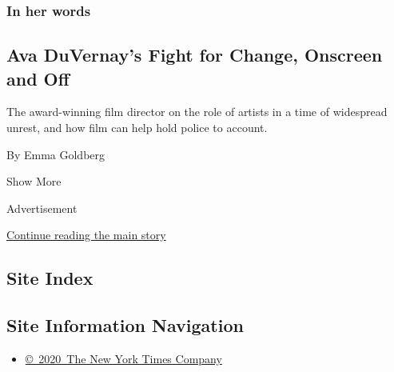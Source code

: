 \begin{enumerate}
  \hypertarget{in-her-words-4}{%
  \subsubsection{In her words}\label{in-her-words-4}}

  \hypertarget{ava-duvernays-fight-for-change-onscreen-and-off}{%
  \subsection{Ava DuVernay's Fight for Change, Onscreen and
  Off}\label{ava-duvernays-fight-for-change-onscreen-and-off}}

  The award-winning film director on the role of artists in a time of
  widespread unrest, and how film can help hold police to account.

  By Emma Goldberg
\end{enumerate}

Show More

Advertisement

\protect\hyperlink{after-mid2}{Continue reading the main story}

\hypertarget{site-index}{%
\subsection{Site Index}\label{site-index}}

\hypertarget{site-information-navigation}{%
\subsection{Site Information
Navigation}\label{site-information-navigation}}

\begin{itemize}
\tightlist
\item
  \href{https://help.nytimes3xbfgragh.onion/hc/en-us/articles/115014792127-Copyright-notice}{©~2020~The
  New York Times Company}
\end{itemize}


